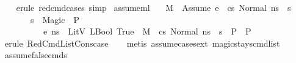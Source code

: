 \begin{isabellebody}
%
\isadelimproof
\ \ %
\endisadelimproof
%
\isatagproof
{}\isamarkupfalse%
\ {\isacharparenleft}{\kern0pt}erule\ red{\isacharunderscore}{\kern0pt}cmd{\isachardot}{\kern0pt}cases{\isacharsemicolon}{\kern0pt}\ simp{\isacharparenright}{\kern0pt}%
\endisatagproof
{\isafoldproof}%
%
\isadelimproof
\isanewline
%
\endisadelimproof
\isanewline
{}\isamarkupfalse%
\ assume{\isacharunderscore}{\kern0pt}ml{\isacharcolon}{\kern0pt}\ \isanewline
\ \ {\isachardoublequoteopen}{\isasymlbrakk}M{\isacharcomma}{\kern0pt}{\isasymLambda}{\isacharcomma}{\kern0pt}{\isasymGamma}{\isacharcomma}{\kern0pt}{\isasymDelta}\ {\isasymturnstile}\ {\isasymlangle}{\isacharparenleft}{\kern0pt}Assume\ e{\isacharparenright}{\kern0pt}\ {\isacharhash}{\kern0pt}\ cs{\isacharcomma}{\kern0pt}\ Normal\ ns{\isasymrangle}\ {\isacharbrackleft}{\kern0pt}{\isasymrightarrow}{\isacharbrackright}{\kern0pt}\ s{\isacharprime}{\kern0pt}{\isacharsemicolon}{\kern0pt}\isanewline
\ \ \ \ \ \ \ s{\isacharprime}{\kern0pt}\ {\isacharequal}{\kern0pt}\ Magic\ {\isasymLongrightarrow}\ P{\isacharsemicolon}{\kern0pt}\isanewline
\ \ \ \ \ \ \ \ {\isasymLambda}{\isacharcomma}{\kern0pt}{\isasymGamma}{\isacharcomma}{\kern0pt}{\isasymDelta}\ {\isasymturnstile}\ {\isasymlangle}e{\isacharcomma}{\kern0pt}\ ns{\isasymrangle}\ {\isasymDown}\ LitV\ {\isacharparenleft}{\kern0pt}LBool\ True{\isacharparenright}{\kern0pt}\ {\isasymLongrightarrow}\ M{\isacharcomma}{\kern0pt}{\isasymLambda}{\isacharcomma}{\kern0pt}{\isasymGamma}{\isacharcomma}{\kern0pt}{\isasymDelta}\ {\isasymturnstile}\ {\isasymlangle}cs{\isacharcomma}{\kern0pt}\ Normal\ ns{\isasymrangle}\ {\isacharbrackleft}{\kern0pt}{\isasymrightarrow}{\isacharbrackright}{\kern0pt}\ s{\isacharprime}{\kern0pt}\ {\isasymLongrightarrow}\ P{\isasymrbrakk}\ {\isasymLongrightarrow}\ P{\isachardoublequoteclose}\isanewline
%
\isadelimproof
\ \ %
\endisadelimproof
%
\isatagproof
{}\isamarkupfalse%
\ {\isacharparenleft}{\kern0pt}erule\ RedCmdListCons{\isacharunderscore}{\kern0pt}case{\isacharparenright}{\kern0pt}\isanewline
\ \ \isamarkupfalse%
\ {\isacharparenleft}{\kern0pt}metis\ assume{\isacharunderscore}{\kern0pt}cases{\isacharunderscore}{\kern0pt}ext\ magic{\isacharunderscore}{\kern0pt}stays{\isacharunderscore}{\kern0pt}cmd{\isacharunderscore}{\kern0pt}list{\isacharparenright}{\kern0pt}%
\endisatagproof
{\isafoldproof}%
%
\isadelimproof
\isanewline
%
\endisadelimproof
\isanewline
{}\isamarkupfalse%
\ assume{\isacharunderscore}{\kern0pt}false{\isacharunderscore}{\kern0pt}cmds{\isacharcolon}{\kern0pt}\isanewline

\end{isabellebody}
